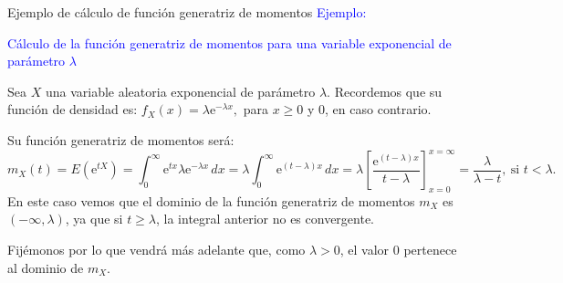 \documentclass[
  ignorenonframetext,
  aspectratio=169]{beamer}
\newcommand\blue[1]{\textcolor{blue}{#1}}
\begin{document}
\begin{frame}{Ejemplo de cálculo de función generatriz de momentos}
\protect\hypertarget{ejemplo-de-cuxe1lculo-de-funciuxf3n-generatriz-de-momentos-1}{}
\blue{Ejemplo:}

\blue{Cálculo de la función generatriz de momentos para una variable exponencial de parámetro $\lambda$}

Sea \(X\) una variable aleatoria exponencial de parámetro \(\lambda\).
Recordemos que su función de densidad es:
\(f_X(x)=\lambda \mathrm{e}^{-\lambda x},\) para \(x\geq 0\) y \(0\), en
caso contrario.

Su función generatriz de momentos será: \[
m_X (t)=E\left(\mathrm{e}^{tX}\right)=\int_0^\infty \mathrm{e}^{t x}\lambda \mathrm{e}^{-\lambda x}\, dx = \lambda \int_0^\infty\mathrm{e}^{(t-\lambda)x}\, dx = \lambda\left[\frac{\mathrm{e}^{(t-\lambda)x}}{t-\lambda}\right]_{x=0}^{x=\infty} = \frac{\lambda}{\lambda -t},\ \mbox{si } t<\lambda. 
\] En este caso vemos que el dominio de la función generatriz de
momentos \(m_X\) es \((-\infty,\lambda)\), ya que si \(t\geq \lambda\),
la integral anterior no es convergente.

Fijémonos por lo que vendrá más adelante que, como \(\lambda >0\), el
valor \(0\) pertenece al dominio de \(m_X\).
\end{frame}
\end{document}
